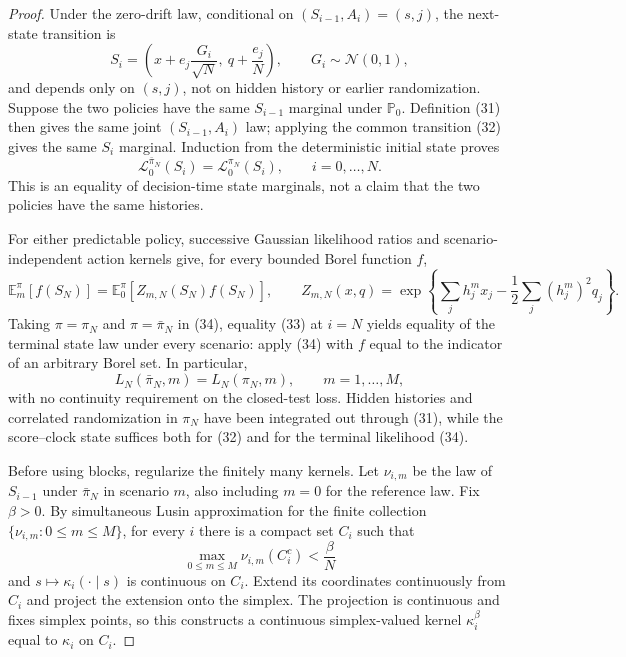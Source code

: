 \documentclass{article}
\begin{document}
\begin{proof}
Under the zero-drift law, conditional on \((S_{i-1},A_i)=(s,j)\), the next-state transition is
\[
 S_i=\left(x+e_j\frac{G_i}{\sqrt N},\ q+\frac{e_j}{N}\right),
 \qquad G_i\sim\mathcal N(0,1),                                 \tag{32}
\]
and depends only on \((s,j)\), not on hidden history or earlier randomization.  Suppose the two policies have the same \(S_{i-1}\) marginal under \(\mathbb P_0\).  Definition (31) then gives the same joint \((S_{i-1},A_i)\) law; applying the common transition (32) gives the same \(S_i\) marginal.  Induction from the deterministic initial state proves
\[
 \mathcal L_0^{\bar\pi_N}(S_i)=\mathcal L_0^{\pi_N}(S_i),
 \qquad i=0,\ldots,N.                                           \tag{33}
\]
This is an equality of decision-time state marginals, not a claim that the two policies have the same histories.

For either predictable policy, successive Gaussian likelihood ratios and scenario-independent action kernels give, for every bounded Borel function \(f\),
\[
 \mathbb E_m^{\pi}[f(S_N)]
 =\mathbb E_0^{\pi}[Z_{m,N}(S_N)f(S_N)],
 \qquad
 Z_{m,N}(x,q)=
 \exp\!\left\{\sum_jh_j^mx_j-\frac12\sum_j(h_j^m)^2q_j\right\}. \tag{34}
\]
Taking \(\pi=\pi_N\) and \(\pi=\bar\pi_N\) in (34), equality (33) at \(i=N\) yields equality of the terminal state law under every scenario: apply (34) with \(f\) equal to the indicator of an arbitrary Borel set.  In particular,
\[
 L_N(\bar\pi_N,m)=L_N(\pi_N,m),\qquad m=1,\ldots,M,              \tag{35}
\]
with no continuity requirement on the closed-test loss.  Hidden histories and correlated randomization in \(\pi_N\) have been integrated out through (31), while the score--clock state suffices both for (32) and for the terminal likelihood (34).

Before using blocks, regularize the finitely many kernels.  Let \(\nu_{i,m}\) be the law of \(S_{i-1}\) under \(\bar\pi_N\) in scenario \(m\), also including \(m=0\) for the reference law.  Fix \(\beta>0\).  By simultaneous Lusin approximation for the finite collection \(\{\nu_{i,m}:0\leq m\leq M\}\), for every \(i\) there is a compact set \(C_i\) such that
\[
 \max_{0\leq m\leq M}\nu_{i,m}(C_i^c)<\frac\beta N             \tag{36}
\]
and \(s\mapsto\kappa_i(\cdot\mid s)\) is continuous on \(C_i\).  Extend its coordinates continuously from \(C_i\) and project the extension onto the simplex.  The projection is continuous and fixes simplex points, so this constructs a continuous simplex-valued kernel \(\kappa_i^\beta\) equal to \(\kappa_i\) on \(C_i\).


\end{proof}
\end{document}
